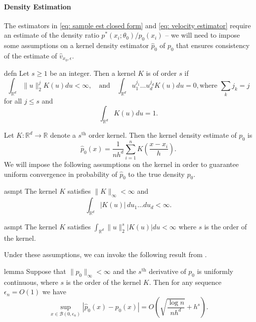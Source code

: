 \documentclass[11pt]{article}
\begin{document}
\paragraph{Density Estimation}
The estimators in \cref{eq: sample est closed form} and \cref{eq: velocity estimator} require an estimate of the density ratio $p^*(x_i;\theta_0)/p_0(x_i)$ -- we will need to impose some assumptions on a kernel density estimator $\hat{p}_0$ of $p_0$ that ensures consistency of the estimate of $\hat{v}_{x_0, \epsilon}$. 
\begin{restatable}{defn}{}
    Let $s \geq 1$ be an integer. Then a kernel $K$ is of order $s$ if 
    \[\int_{\mathbb{R}^d}\|u\|_2^jK(u)du < \infty, \quad \text{and}\quad \int_{\mathbb{R}^d}u_1^{j_1}\dots u_d^{j_d}K(u) du = 0, \text{where } \sum_kj_k = j\]
    for all $j \leq s$ and 
    \[\int_{\mathbb{R}^d}K(u)du = 1.\]
\end{restatable}
Let $K:\mathbb{R}^d \rightarrow \mathbb{R}$ denote a $s^{\text{th}}$ order kernel. Then the kernel density estimate of $p_0$ is
\begin{equation}
    \hat{p}_0(x) = \frac{1}{nh^d}\sum_{i = 1}^nK\left(\frac{x -x_i}{h}\right). \label{eq: kde}
\end{equation}
We will impose the following assumptions on the kernel in order to guarantee uniform convergence in probability of $\hat{p}_0$ to the true density $p_0$.


\begin{restatable}{asmpt}{} \label{assumption: boundedness and integrability}
    The kernel $K$ satisfies $\|K\|_{\infty} < \infty$ and 
    \[\int_{\mathbb{R}^d}|K(u)|\,du_1\dots du_d < \infty.\]
\end{restatable}

\begin{restatable}{asmpt}{} \label{assumption: kernel smoothness}
    The kernel $K$ satisfies $\int_{\mathbb{R}^d}\|u\|_2^s|K(u)|du  < \infty$ where $s$ is the order of the kernel. 
\end{restatable}
Under these assumptions, we can invoke the following result from \citet{hansen2008uniform}.
\begin{restatable}{lemma}{} \label{lemma: uniform convergence of kde}
    Suppose that $\|p_0\|_{\infty}< \infty$ and the $s^{\text{th}}$ derivative of $p_0$ is uniformly continuous, where $s$ is the order of the kernel $K$. Then for any sequence $\epsilon_n  = O(1)$ we have
    \[\sup_{x \in \mathcal{B}(0, \epsilon_n)}\left|\hat{p}_0(x) - p_0(x)\right| = O\left(\sqrt{\frac{\log n}{nh^d}} +h^s \right).\]
\end{restatable}
\end{document}

